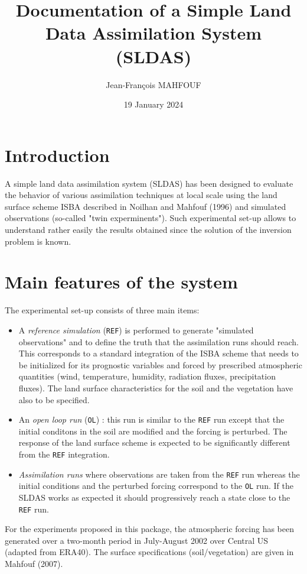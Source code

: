 \documentclass[12pt]{article}
\begin{document}
\title{Documentation of a Simple Land Data Assimilation System (SLDAS)}
\author{Jean-Fran\c cois MAHFOUF}
\date{19 January 2024}
\maketitle
\section{Introduction}
A simple land data assimilation system (SLDAS) has been designed
to evaluate the behavior of various assimilation techniques at local scale
using the land surface scheme ISBA described in Noilhan and Mahfouf (1996)
and simulated observations (so-called "twin experminents"). 
Such experimental set-up allows to understand rather easily 
the results obtained since the solution of the inversion problem is known.
\section{Main features of the system}
The experimental set-up consists of three main items:
\begin{itemize}
\item A {\it reference simulation} ({\tt REF}) is performed to generate 
"simulated observations" and to define the truth that the assimilation
runs should reach. 
This corresponds to a standard integration of the
ISBA scheme that needs to be initialized for its prognostic variables
and forced by prescribed atmospheric quantities (wind, temperature,
humidity, radiation fluxes, precipitation fluxes). The land surface
characteristics for the soil and the vegetation have also to be specified.
\item An {\it open loop run} ({\tt OL}) : this run is similar to the {\tt REF} run except
that the initial conditons in the soil are modified and the forcing
is perturbed. The response of the land surface scheme is expected to be
significantly different from the {\tt REF} integration.
\item {\it Assimilation runs} where observations are taken from the {\tt REF} run
whereas the initial conditions and the perturbed forcing correspond to the
{\tt OL} run. If the SLDAS works as expected it should progressively 
reach a state close to the {\tt REF} run. 
\end{itemize}
\vspace{0.5cm}
For the experiments proposed in this package,
the atmospheric forcing has been generated over a two-month period
in July-August 2002 over Central US (adapted from ERA40). The surface
specifications (soil/vegetation) are given in Mahfouf (2007). 
\end{document}
